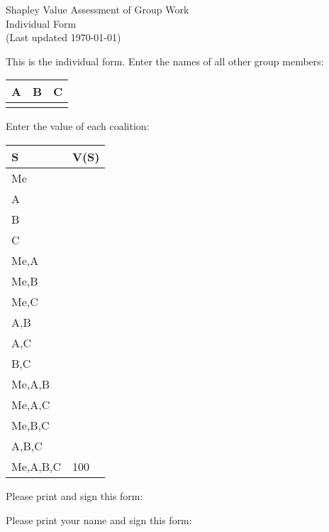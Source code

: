 \documentclass[12pt]{article}
\begin{document}
\begin{center}
\Large{Shapley Value Assessment of Group Work}\\
Individual Form\\
\tiny{(Last updated \today)}
\end{center}
This is the individual form. Enter the names of all other group members:
\vspace{1cm}

\begin{center}
\begin{tabular}{p{3cm}|p{3cm}|p{3cm}}
A&B&C\\
\hline
&&
\end{tabular}
\end{center}
\vspace{1cm}

Enter the value of each coalition:
\vspace{.5cm}

\begin{center}
\begin{tabular}{l|p{2cm}}
S&V(S)\\\hline
Me&\\\hline
A&\\\hline
B&\\\hline
C&\\\hline
Me,A&\\\hline
Me,B&\\\hline
Me,C&\\\hline
A,B&\\\hline
A,C&\\\hline
B,C&\\\hline
Me,A,B&\\\hline
Me,A,C&\\\hline
Me,B,C&\\\hline
A,B,C&\\\hline
Me,A,B,C&100\\\hline
\end{tabular}
\end{center}
\vspace{.5cm}

Please print and sign this form:

\vspace{.5cm}
Please print your name and sign this form:
\end{document}
